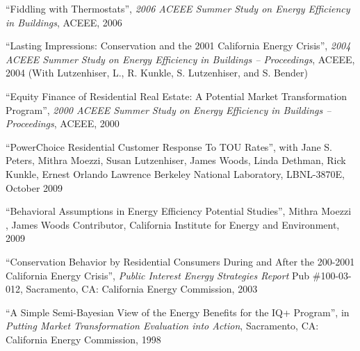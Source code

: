 \documentclass[Computer Science]{vita}
\begin{document}
\begin{vita}
\begin{Selected Publications}
\begin{Papers at Refereed Conferences}
    \item ``Fiddling with Thermostats'', \emph{2006 ACEEE Summer Study
        on Energy Efficiency in Buildings}, ACEEE, 2006

    \item ``Lasting Impressions: Conservation and the 2001 California
      Energy Crisis'', \emph{2004 ACEEE Summer Study on Energy
        Efficiency in Buildings -- Proceedings}, ACEEE, 2004 (With
      Lutzenhiser, L., R. Kunkle, S. Lutzenhiser, and S. Bender)

    \item ``Equity Finance of Residential Real Estate: A Potential
      Market Transformation Program'', \emph{2000 ACEEE Summer Study
        on Energy Efficiency in Buildings -- Proceedings}, ACEEE, 2000
    \end{Papers at Refereed Conferences}
   
    \begin{Unrefereed Public Reports}
    
    \item ``PowerChoice Residential Customer Response To TOU Rates'',
      with Jane S. Peters, Mithra Moezzi, Susan Lutzenhiser, James
      Woods, Linda Dethman, Rick Kunkle, Ernest Orlando Lawrence
      Berkeley National Laboratory, LBNL-3870E, October 2009

    \item ``Behavioral Assumptions in Energy Efficiency Potential
      Studies'', Mithra Moezzi , James Woods Contributor, California
      Institute for Energy and Environment, 2009

    \item ``Conservation Behavior by Residential Consumers During and
      After the 200-2001 California Energy Crisis'', \emph{Public
        Interest Energy Strategies Report} Pub \#100-03-012,
      Sacramento, CA: California Energy Commission, 2003

	
    \item ``A Simple Semi-Bayesian View of the Energy Benefits for the
      IQ+ Program'', in \emph{Putting Market Transformation Evaluation
        into Action}, Sacramento, CA: California Energy Commission,
      1998
	
    \end{Unrefereed Public Reports}


  \end{Selected Publications}



\end{vita}
\end{document}
